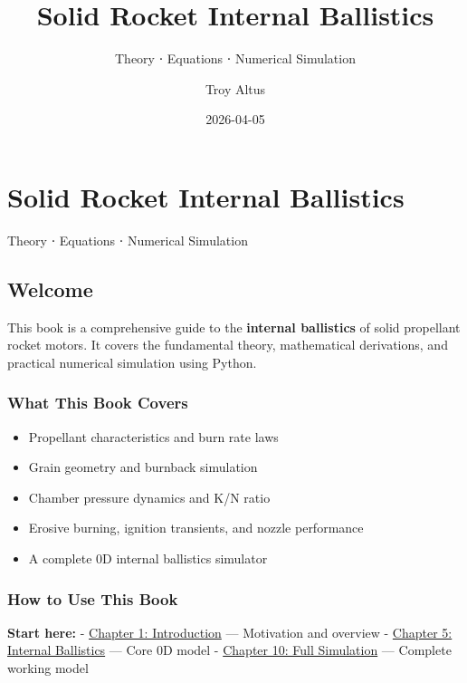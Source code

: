 \documentclass[
  letterpaper,
  DIV=11,
  numbers=noendperiod]{scrreprt}
\title{Solid Rocket Internal Ballistics}
\subtitle{Theory ⋅ Equations ⋅ Numerical Simulation}
\author{Troy Altus}
\date{2026-04-05}
\providecommand{\tightlist}{%
  \setlength{\itemsep}{0pt}\setlength{\parskip}{0pt}}
\renewcommand*\contentsname{Table of contents}
\newcommand\contentsname{Table of contents}
\begin{document}
\maketitle

\renewcommand*\contentsname{Table of contents}
{
\setcounter{tocdepth}{2}
\tableofcontents
}


\chapter{Solid Rocket Internal
Ballistics}\label{solid-rocket-internal-ballistics}

Theory ⋅ Equations ⋅ Numerical Simulation

\hfill\break

\section{Welcome}\label{welcome}

This book is a comprehensive guide to the \textbf{internal ballistics}
of solid propellant rocket motors. It covers the fundamental theory,
mathematical derivations, and practical numerical simulation using
Python.

\subsection{What This Book Covers}\label{what-this-book-covers}

\begin{itemize}
\tightlist
\item
  Propellant characteristics and burn rate laws
\item
  Grain geometry and burnback simulation
\item
  Chamber pressure dynamics and K/N ratio
\item
  Erosive burning, ignition transients, and nozzle performance
\item
  A complete 0D internal ballistics simulator
\end{itemize}

\subsection{How to Use This Book}\label{how-to-use-this-book}

\textbf{Start here:} - \href{chapters/01-intro.qmd}{Chapter 1:
Introduction} --- Motivation and overview -
\href{chapters/05-internal-ballistics.qmd}{Chapter 5: Internal
Ballistics} --- Core 0D model -
\href{chapters/10-full-simulation.qmd}{Chapter 10: Full Simulation} ---
Complete working model
\end{document}
